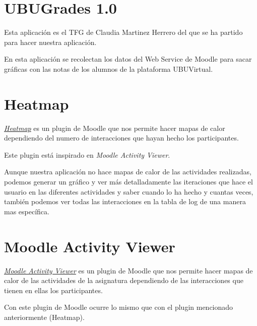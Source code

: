 
\section{UBUGrades 1.0}\label{ubugrades--10}

Esta aplicación es el TFG de Claudia Martinez Herrero \cite{claudia} del que se ha partido para hacer nuestra aplicación.

En esta aplicación se recolectan los datos del Web Service de Moodle para sacar gráficas con las notas de los alumnos de la plataforma UBUVirtual.

\newpage\section{Heatmap}\label{heatmap}

\href{https://moodle.org/plugins/block_heatmap}{\emph{Heatmap}} es un plugin de Moodle que nos permite hacer mapas de calor dependiendo del numero de interacciones que hayan hecho los participantes.

Este plugin está inspirado en \emph{Moodle Activity Viewer}.


Aunque nuestra aplicación no hace mapas de calor de las actividades realizadas, podemos generar un gráfico y ver más detalladamente las iteraciones que hace el usuario en las diferentes actividades y saber cuando lo ha hecho y cuantas veces, también podemos ver todas las interacciones en la tabla de log de una manera mas específica.


\newpage\section{ Moodle Activity Viewer}\label{moodle-activity-viewer}

\href{https://damos.world/2013/08/30/the-moodle-activity-viewer-mav-heatmaps-of-student-activity/}{ \emph{Moodle Activity Viewer}} es un plugin de Moodle que nos permite hacer mapas de calor de las actividades de la asignatura dependiendo de las interacciones que tienen en ellas los participantes.


Con este plugin de Moodle ocurre lo mismo que con el plugin mencionado anteriormente (Heatmap).

